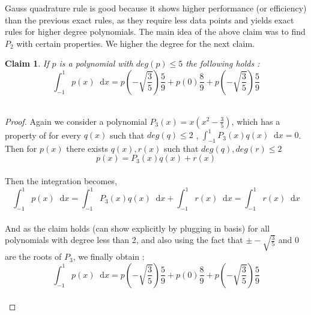 \documentclass[paper=a4, fontsize=11pt]{scrartcl}
\newcommand*\dif{\mathop{}\!\mathrm{d}}
\newtheorem{claim}{Claim}
\begin{document}
Gauss quadrature rule is good because it shows higher performance (or efficiency) than the previous exact rules, as they require less data points and yields exact rules for higher degree polynomials. The main idea of the above claim was to find $P_2$ with certain properties. We higher the degree for the next claim.\\

\begin{claim}
	If $p$ is a polynomial with $deg(p)\leq5$ the following holds : \\
	
	\begin{equation}\nonumber
		\int_{-1}^{1} p(x) \dif x =  p\left( - \sqrt{\frac{3}{5}} \right)\frac{5}{9} +p(0) \frac{8}{9}+ p\left( -\sqrt{\frac{3}{5}} \right)\frac{5}{9}
	\end{equation}\\
\end{claim} 

\begin{proof}
Again we consider a polynomial $P_3(x) = x \left( x^2 -\frac{3}{5} \right)$, which has a property of for every $q(x)$ such that $deg(q) \leq 2$ , $\int_{-1}^{1} P_3(x) q(x) \dif x = 0$. Then for $p(x)$ there exists $q(x),r(x)$ such that $deg(q),deg(r) \leq 2$\\

\begin{equation}\nonumber
	p(x) = P_3(x) q(x) + r(x)
\end{equation}\\

Then the integration becomes, \\

\begin{equation}\nonumber
 		\int_{-1}^{1} p(x) \dif x = 	\int_{-1}^{1} P_3(x) q(x) \dif x  + 	\int_{-1}^{1} r(x) \dif x = 	\int_{-1}^{1} r(x) \dif x
\end{equation}\\

And as the claim holds (can show explicitly by plugging in basis) for all polynomials with degree less than 2, and also using the fact that $\pm -\sqrt{\frac{3}{5}}$ and $0$ are the roots of $P_3$, we finally obtain : \\

\begin{equation}\nonumber
	\int_{-1}^{1} p(x) \dif x =  p\left( - \sqrt{\frac{3}{5}} \right)\frac{5}{9} +p(0) \frac{8}{9}+ p\left( -\sqrt{\frac{3}{5}} \right)\frac{5}{9}
\end{equation}\\
\end{proof}
\end{document}
